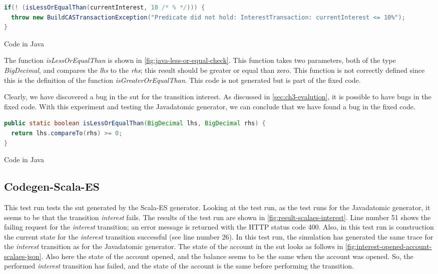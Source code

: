 \begin{sourcecode}[h!]
\begin{lstlisting}[language=Java]
if(! (isLessOrEqualThan(currentInterest, 10 /* % */))) {
  throw new BuildCASTransactionException("Predicate did not hold: InterestTransaction: currentInterest <= 10%");
}
\end{lstlisting}
\caption{Code in Java}\label{fig:java-gen-interest-pre}
\end{sourcecode}
\FloatBarrier

The function \textit{isLessOrEqualThan} is shown in
\autoref{fig:java-less-or-equal-check}. This function takes two parameters, both
of the type \textit{BigDecimal}, and compares the \textit{lhs} to the
\textit{rhs}; this result should be greater or equal than zero. This function
is not correctly defined since this is the definition of the function
\textit{isGreaterOrEqualThan}. This code is not generated but is part of the
fixed code.

Clearly, we have discovered a bug in the \gls{sut} for the transition
interest. As discussed in \autoref{sec:ch3-evalution}, it is possible to have
bugs in the fixed code. With this experiment and testing the Javadatomic
generator, we can conclude that we have found a bug in the fixed code.

\begin{sourcecode}[h!]
\begin{lstlisting}[language=Java]
public static boolean isLessOrEqualThan(BigDecimal lhs, BigDecimal rhs) {
  return lhs.compareTo(rhs) >= 0;
}
\end{lstlisting}
\caption{Code in Java}\label{fig:java-less-or-equal-check}
\end{sourcecode}
\FloatBarrier

\subsection{Codegen-Scala-ES}\label{sec:bug-interest-scalaes}

This test run tests the \gls{sut} generated by the Scala-ES generator. Looking at the
test run, as the test runs for the Javadatomic generator, it seems to be
that the transition \textit{interest} fails. The results of the test run are shown in
\autoref{fig:result-scalaes-interest}. Line number 51 shows the failing request
for the \textit{interest} transition; an error message is returned with the HTTP status
code 400. Also, in this test run is construction the current state for the
\textit{interest} transition successful (see line number 26). In this test run, the
simulation has generated the same trace for the \textit{interest} transition as for the
Javadatomic generator. The state of the account in the \gls{sut} looks as follows in
\autoref{fig:interest-opened-account-scalaes-json}. Also here the state of the
account opened, and the balance seems to be the same when the account was opened.
So, the performed \textit{interest} transition has failed, and the state of the account
is the same before performing the transition.

